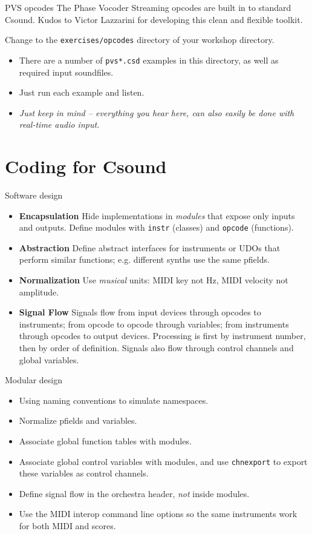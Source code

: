 \documentclass{beamer}
\begin{document}
\begin{frame}{PVS opcodes}
The Phase Vocoder Streaming opcodes are built in to standard Csound. Kudos to Victor Lazzarini for developing this clean and flexible toolkit.
\begin{example}
Change to the \texttt{exercises/opcodes} directory of your workshop directory.
\begin{itemize}
\item There are a number of \texttt{pvs*.csd} examples in this directory, as well as required input soundfiles.
\item Just run each example and listen. 
\item \emph{Just keep in mind -- everything you hear here, can also easily be done with real-time audio input.}
\end{itemize}
\end{example}
\end{frame}

\section{Coding for Csound}
\begin{frame}{Software design}
\begin{itemize}
\item \textbf{Encapsulation} Hide implementations in \textit{modules} that
expose only inputs and outputs. Define modules with \texttt{instr} (classes) and
\texttt{opcode} (functions).
\item \textbf{Abstraction} Define abstract interfaces for instruments or
UDOs that perform similar functions; e.g. different synths use the same
pfields.
\item \textbf{Normalization} Use \textit{musical} units: MIDI key not
Hz, MIDI velocity not amplitude.
\item \textbf{Signal Flow} Signals flow from input devices through
opcodes to instruments; from opcode to opcode through variables; from
instruments through opcodes to output devices. Processing is first by
instrument number, then by order of definition. Signals also flow through
control channels and global variables.
\end{itemize}
\end{frame}

\begin{frame}{Modular design}
\begin{itemize}
\item Using naming conventions to simulate namespaces.
\item Normalize pfields and variables.
\item Associate global function tables with modules.
\item Associate global control variables with modules, and use
\texttt{chnexport} to export these variables as control channels.
\item Define signal flow in the orchestra header, \textit{not} inside modules.
\item Use the MIDI interop command line options so the same instruments work for both MIDI and scores.
\end{itemize}
\end{frame}
\end{document}
